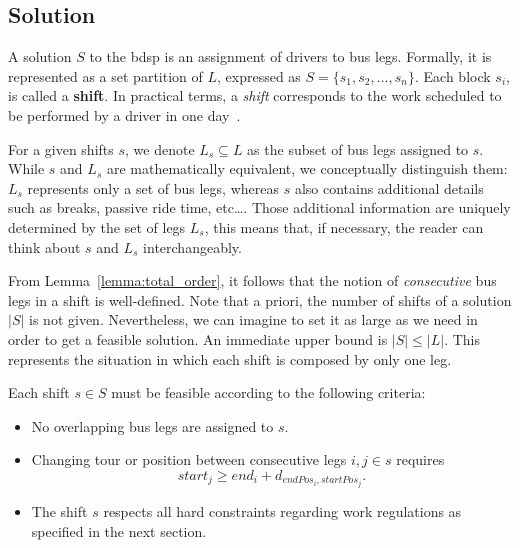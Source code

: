 \documentclass[]{amsart}
\newcommand{\abs}[1]{\left\lvert #1 \right\rvert}
\theoremstyle{plain}
\begin{document}
\subsection{Solution}
A solution $S$ to the \gls{bdsp} is an assignment of drivers to bus legs. 	Formally, it is represented as a set  partition of $L$, expressed as $S =\{s_1,s_2,\dots, s_n\}$.  Each block $s_i$, is called a \textbf{shift}. In practical terms, a \textit{shift} corresponds to the work scheduled to be performed by a driver in one day~\cite{wren2004scheduling}.

For a given shifts $s$, we denote $L_s\subseteq  L$ as the subset of bus legs assigned to $s$. While $s$ and $L_s$ are mathematically equivalent, we conceptually distinguish them:  $L_s$ represents only a set of bus legs, whereas $s$ also contains additional details such as breaks, passive ride time, etc\dots. Those additional information are uniquely determined by the set of legs $L_s$, this means that, if necessary, the reader can think about $s$ and $L_s$ interchangeably.

From Lemma~\ref{lemma:total_order}, it follows that the notion of  \textit{consecutive} bus legs in a shift is well-defined.
 Note that a priori, the number of shifts of a solution $\abs{S}$ is not given. Nevertheless, we can imagine to set it as large as we need in order to get a feasible solution. An immediate upper bound is $\abs{S} \le \abs{L}$. This represents the situation in which each shift is composed by only one leg. 

Each shift $s\in S$ must be feasible according to the following criteria:
\begin{itemize}
	\item No overlapping bus legs are assigned to $s$.
	\item Changing tour or position between consecutive legs $i,j\in s$ requires \[\mathit{start}_j\ge\mathit{end}_i+d_{\mathit{endPos}_i,\mathit{startPos}_j}.\]
	\item The shift $s$ respects all hard constraints regarding work regulations as specified in the next section.
\end{itemize}
\end{document}

